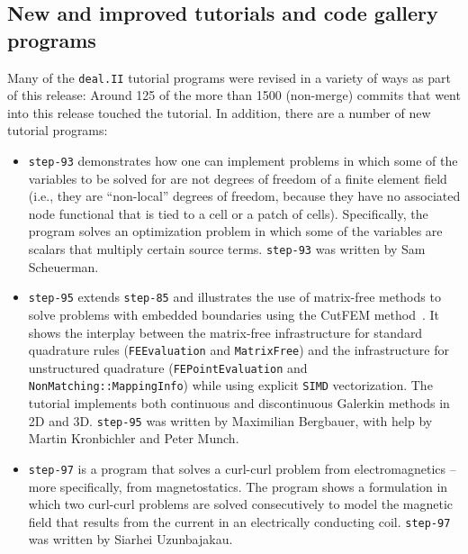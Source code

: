 \documentclass{ansarticle-preprint}
\newcommand{\specialword}[1]{\texttt{#1}}
\newcommand{\dealii}{{\specialword{deal.II}}\xspace}
\newcommand{\step}[1]{{\specialword{step-#1}}\xspace}
\begin{document}
\subsection{New and improved tutorials and code gallery programs}
\label{subsec:steps}

Many of the \dealii tutorial programs were revised in a variety of ways
as part of this release: Around 125 of the more than 1500 (non-merge)
commits that went into this release touched the tutorial.
In addition, there are a number of new tutorial
programs:
\begin{itemize}
  \item
    \step{93}
    demonstrates how one can implement problems in which some of the
    variables to be solved for are not degrees of freedom of a finite
    element field (i.e., they are ``non-local'' degrees of freedom, because
    they have no associated node functional that is tied to a cell or
    a patch of cells). Specifically, the program solves an
    optimization problem in which some of the variables are scalars
    that multiply certain source terms.
    \step{93} was written by Sam Scheuerman.
  \item
    \step{95} extends \step{85} and illustrates the use of matrix-free methods to solve
    problems with embedded boundaries using the CutFEM method~\cite{bergbauer2025high}.
    It shows the interplay between the matrix-free infrastructure for standard quadrature rules
    (\texttt{FEEvaluation} and \texttt{MatrixFree}) and the infrastructure for unstructured
     quadrature (\texttt{FEPointEvaluation} and \texttt{NonMatching::MappingInfo}) while using explicit
     \texttt{SIMD} vectorization. The tutorial implements both continuous and discontinuous Galerkin
     methods in 2D and 3D.
    \step{95} was written by Maximilian Bergbauer, with help by Martin Kronbichler and Peter Munch.
  \item
    \step{97}
    is a program that solves a curl-curl problem from electromagnetics
    -- more specifically, from magnetostatics. The program shows a
    formulation in which two curl-curl problems are solved
    consecutively to model the magnetic field that results from the
    current in an electrically conducting coil.
    \step{97} was written by Siarhei Uzunbajakau.
\end{itemize}
\end{document}
